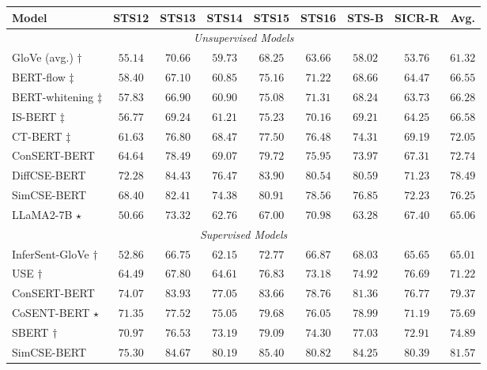 \documentclass{article} \usepackage{iclr2024_conference,times}
\begin{document}
\begin{table*}[ht]
\small
\centering
\begin{threeparttable}
\begin{tabular}{lcccccccc}
\toprule
Model & STS12 & STS13 & STS14 & STS15 & STS16 & STS-B & SICR-R & Avg. \\

\midrule
\midrule
\multicolumn{9}{c}{\textit{Unsupervised Models}} \\

\midrule
GloVe (avg.) $\dagger$ & $55.14$ & $70.66$ & $59.73$  & $68.25$  & $63.66$  & $58.02$   & $53.76$ & $61.32$ \\ 
BERT-flow $\ddagger$ & $58.40$ & $67.10$ & $60.85$  & $75.16$  & $71.22$  & $68.66$   & $64.47$ & $66.55$ \\
BERT-whitening $\ddagger$ & $57.83$ & $66.90$ & $60.90$  & $75.08$  & $71.31$  & $68.24$   & $63.73$ & $66.28$ \\
IS-BERT $\ddagger$ & $56.77$ & $69.24$ & $61.21$ & $75.23$ & $70.16$ & $69.21$ & $64.25$ & $66.58$ \\
CT-BERT $\ddagger$ & $61.63$ & $76.80$ & $68.47$ & $77.50$ & $76.48$ & $74.31$ & $69.19$ & $72.05$ \\
ConSERT-BERT & $64.64$ & $78.49$ & $69.07$ & $79.72$ & $75.95$ & $73.97$ & $67.31$ & $72.74$ \\
DiffCSE-BERT & $72.28$ & $84.43$ & $76.47$ & $83.90$ & $80.54$ & $80.59$ & $71.23$ & $78.49$ \\
SimCSE-BERT  & $68.40$ & $82.41$ & $74.38$ & $80.91$ & $78.56$ & $76.85$ & $72.23$ & $76.25$ \\
LLaMA2-7B $\star$ & $50.66$ & $73.32$ & $62.76$ & $67.00$ & $70.98$ & $63.28$ & $67.40$ & $65.06$ \\

\midrule
\midrule
\multicolumn{9}{c}{\textit{Supervised Models}} \\
\midrule

InferSent-GloVe $\dagger$  & $52.86$ & $66.75$ & $62.15$ & $72.77$ & $66.87$ & $68.03$ & $65.65$ & $65.01$ \\
USE $\dagger$ & $64.49$ & $67.80$ & $64.61$ & $76.83$ & $73.18$ & $74.92$ & $76.69$ & $71.22$ \\
ConSERT-BERT & $74.07$ & $83.93$ & $77.05$ & $83.66$ & $78.76$ & $81.36$ & $76.77$ & $79.37$ \\
CoSENT-BERT $\star$ & $71.35$ & $77.52$ & $75.05$ & $79.68$ & $76.05$ & $78.99$ & $71.19$ & $75.69$ \\
SBERT $\dagger$ & $70.97$ & $76.53$ & $73.19$ & $79.09$ & $74.30$ & $77.03$ & $72.91$ & $74.89$ \\
SimCSE-BERT & $75.30$ & $84.67$ & $80.19$ & $85.40$ & $80.82$ & $84.25$ & $80.39$ & $81.57$ \\






\end{tabular}
\end{threeparttable}
\end{table*}
\end{document}
